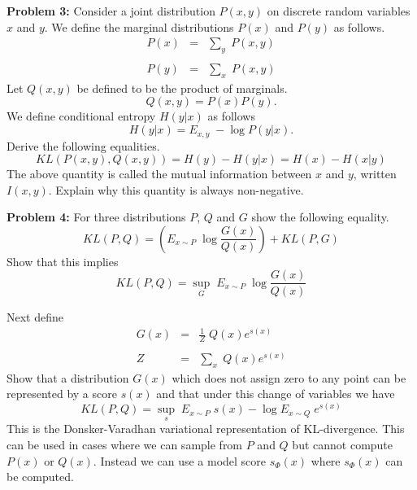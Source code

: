\documentclass{article}
\begin{document}
\bigskip
{\bf Problem 3:} Consider a joint distribution $P(x,y)$ on discrete random variables $x$ and $y$.
We define the marginal distributions $P(x)$ and $P(y)$ as follows.
\begin{eqnarray*}
  P(x) & = & \sum_y\;P(x,y) \\
  \\
  P(y) & = & \sum_x\;P(x,y)
\end{eqnarray*}
Let $Q(x,y)$ be defined to be the product of marginals.
$$Q(x,y) = P(x)P(y).$$
We define conditional entropy $H(y|x)$ as follows
$$H(y|x) = E_{x,y} \;-\log P(y|x).$$
Derive the following equalities.
$$KL(P(x,y),Q(x,y)) = H(y) - H(y|x) = H(x) - H(x|y)$$
The above quantity is called the mutual information between $x$ and $y$, written $I(x,y)$.
Explain why this quantity is always non-negative.
    
\bigskip
{\bf Problem 4:}
For three distributions $P$, $Q$ and $G$ show the following equality.
$$KL(P,Q) =  \left(E_{x \sim P} \;\log \frac{G(x)}{Q(x)}\right) + KL(P,G)$$
Show that this implies
$$KL(P,Q) =  \sup_G \;E_{x \sim P}\; \log \frac{G(x)}{Q(x)}$$

Next define
\begin{eqnarray*}
  G(x) & = & \frac{1}{Z}\;Q(x)e^{s(x)} \\
  \\
  Z & = & \sum_x \;Q(x)e^{s(x)}
\end{eqnarray*}
Show that a distribution $G(x)$ which does not assign zero to any point can be represented by a score $s(x)$ and that under this
change of variables we have
$$KL(P,Q) =  \sup_s \;E_{x \sim P}\; s(x) - \log E_{x \sim Q} \;e^{s(x)}$$
This is the Donsker-Varadhan variational representation of KL-divergence.
This can be used in cases where we can sample from $P$ and $Q$ but cannot compute $P(x)$ or $Q(x)$.
Instead we can use a model score $s_\Phi(x)$ where $s_\Phi(x)$ can be computed.



  
\end{document}
